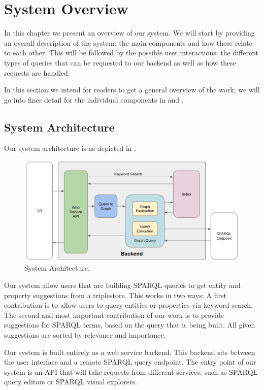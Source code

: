 \chapter{System Overview}
\label{chap:overview}

In this chapter we present an overview of our system. 
We will start by providing an overall description of the system: 
the main components and how these relate to each other. 
This will be followed by the possible user interactions: 
the different types of queries that can be requested to our backend as well as how these requests are handled.

In this section we intend for readers to get a general overview of the work; we will go into finer detail for the individual components in  and .

\section{System Architecture}

Our system architecture is as depicted in .

\begin{figure}[H]
    \centering
        \includegraphics[width=\linewidth]{imagenes/architecture.png}
        \caption{System Architecture.}
        \label{fig:architecture}
\end{figure}

Our system allow users that are building SPARQL queries to get entity and property suggestions from a triplestore. 
This works in two ways: 
A first contribution is to allow users to query entities or properties via keyword search. 
The second and most important contribution of our work is to provide suggestions for SPARQL terms, based on the query that is being built. 
All given suggestions are sorted by relevance and importance.

Our system is built entirely as a web service backend. 
This backend sits between the user interface and a remote SPARQL query endpoint. 
The entry point of our system is an API that will take requests from different services, such as SPARQL query editors or SPARQL visual explorers. 

